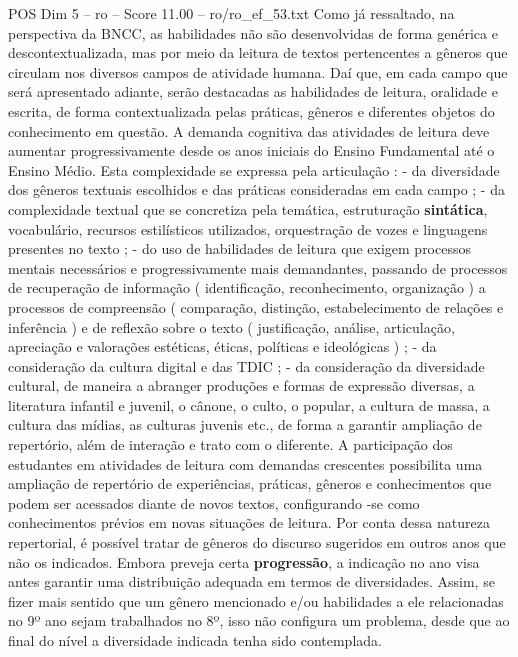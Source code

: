 \begin{textsample}{POS Dim 5 – ro – Score 11.00 – ro/ro\_ef\_53.txt}  \label{ex:f5_pos_114}
Como já ressaltado, na perspectiva da BNCC, as habilidades não são desenvolvidas de forma genérica e descontextualizada, mas por meio da leitura de textos pertencentes a gêneros que circulam nos diversos campos de atividade humana.
Daí que, em cada campo que será apresentado adiante, serão destacadas as habilidades de leitura, oralidade e escrita, de forma contextualizada pelas práticas, gêneros e diferentes objetos do conhecimento em questão.
A demanda cognitiva das atividades de leitura deve aumentar progressivamente desde os anos iniciais do Ensino Fundamental até o Ensino Médio.
Esta complexidade se expressa pela articulação : - da diversidade dos gêneros textuais escolhidos e das práticas consideradas em cada campo ; - da complexidade textual que se concretiza pela temática, estruturação \textbf{sintática}, vocabulário, recursos estilísticos utilizados, orquestração de vozes e linguagens presentes no texto ; - do uso de habilidades de leitura que exigem processos mentais necessários e progressivamente mais demandantes, passando de processos de recuperação de informação ( identificação, reconhecimento, organização ) a processos de compreensão ( comparação, distinção, estabelecimento de relações e inferência ) e de reflexão sobre o texto ( justificação, análise, articulação, apreciação e valorações estéticas, éticas, políticas e ideológicas ) ; - da consideração da cultura digital e das TDIC ; - da consideração da diversidade cultural, de maneira a abranger produções e formas de expressão diversas, a literatura infantil e juvenil, o cânone, o culto, o popular, a cultura de massa, a cultura das mídias, as culturas juvenis etc., de forma a garantir ampliação de repertório, além de interação e trato com o diferente.
A participação dos estudantes em atividades de leitura com demandas crescentes possibilita uma ampliação de repertório de experiências, práticas, gêneros e conhecimentos que podem ser acessados diante de novos textos, configurando -se como conhecimentos prévios em novas situações de leitura.
Por conta dessa natureza repertorial, é possível tratar de gêneros do discurso sugeridos em outros anos que não os indicados.
Embora preveja certa \textbf{progressão}, a indicação no ano visa antes garantir uma distribuição adequada em termos de diversidades.
Assim, se fizer mais sentido que um gênero mencionado e/ou habilidades a ele relacionadas no 9º ano sejam trabalhados no 8º, isso não configura um problema, desde que ao final do nível a diversidade indicada tenha sido contemplada.

\end{textsample}
